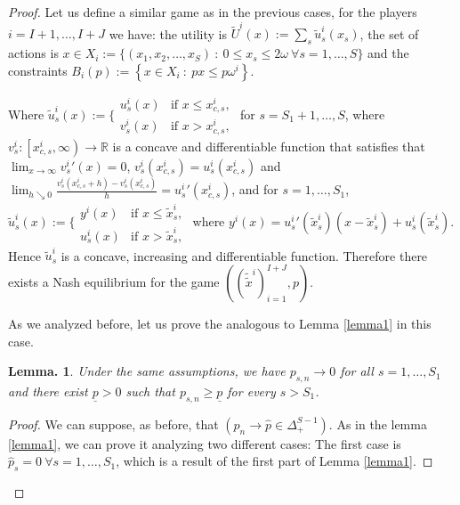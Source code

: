 \documentclass[pdftex]{article}
\numberwithin{equation}{section}
\theoremstyle{th}
\newtheorem{lemma}{{Lemma}.}%
\newtheorem{proof lemma}{{Proof Lemma}.}
\theoremstyle{definition}
\newtheorem*{risk lovers}{Risk lovers}
\newtheorem*{risk averse}{Risk averse}
\begin{document}
{\begin{proof}
Let us define a similar game as in the previous cases, for the players $i=I+1,\dots,I+J$ we have: the utility is $\tilde{U}^i(x):=\sum_s\tilde{u}^i_{s}(x_s)$, the set of actions is $x\in{X_i}:=\{\left(x_1,x_2,\dots,{x}_S\right)\ :\ 0\leq{x}_s\leq2\omega\ \forall{s}=1,\dots,S\}$ and the constraints $B_i(p):=\left\{x\in{X_i}\ :\ px\leq{p\omega^i}\right\}$.

Where $\tilde{u}^i_{s}(x):=\Bigg\{\begin{matrix}u^{i}_s(x) & \textrm{if }x\leq{x}_{c,s}^i,\\
v^i_s(x) & \textrm{if }x>{x}_{c,s}^i,\end{matrix}$
for $s=S_1+1,\dots,S$, where $v^i_s:\left[x^i_{c,s},\infty\right)\rightarrow\mathbb{R}$ is a concave and differentiable function that satisfies that $\lim_{x\rightarrow\infty}{v^i_s}'(x)=0$, $v^i_s\left(x^i_{c,s}\right)={u^i_s}\left(x^i_{c,s}\right)$ and $\lim_{h\searrow0}\frac{v^i_s\left(x^i_{c,s}+h\right)-v^i_s\left(x^i_{c,s}\right)}{h}={u^i_s}'\left(x^i_{c,s}\right)$, and for $s=1,\dots,S_1$, 
$\tilde{u}^i_{s}(x):=\Bigg\{\begin{matrix}y^{i}(x) & \textrm{if }x\leq\tilde{x}^i_s,\\
u^i_s(x) & \textrm{if }x>\tilde{x}^i_s,\end{matrix}$ where $y^i(x)={u^i_s}'\left(\tilde{x}^i_s\right)\left(x-\tilde{x}^i_s\right)+u^i_s\left(\tilde{x}^i_s\right)$. Hence $\tilde{u}^i_{s}$ is a concave, increasing and differentiable function. Therefore there exists a Nash equilibrium for the game $\left(\left(\tilde{\tilde{x}}^i\right)_{i=1}^{I+J},p\right)$.

As we analyzed before, let us prove the analogous to Lemma \ref{lemma1} in this case.
\begin{lemma}
\label{lemma3}
Under the same assumptions, we have $p_{s,n}\rightarrow0$ for all $s=1,\dots,S_1$ and there exist $\underline{p}>0$ such that $p_{s,n}\geq\underline{p}$ for every $s>S_1$.
\end{lemma}
\begin{proof}%
We can suppose, as before, that $\left(p_n\rightarrow\hat{p}\in\Delta_{+}^{S-1}\right)$. As in the lemma \ref{lemma1}, we can prove it analyzing two different cases: The first case is $\hat{p}_s=0\ \forall{s}=1,\dots,S_1$, which is a result of the first part of Lemma \ref{lemma1}.


\end{proof}
\end{proof}}
\end{document}
